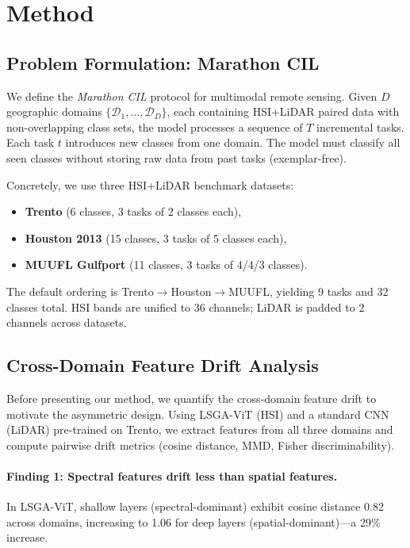 \section{Method}
\label{sec:method}

\subsection{Problem Formulation: Marathon CIL}
\label{sec:protocol}

We define the \emph{Marathon CIL} protocol for multimodal remote sensing. Given $D$ geographic domains $\{\mathcal{D}_1, \dots, \mathcal{D}_D\}$, each containing HSI+LiDAR paired data with non-overlapping class sets, the model processes a sequence of $T$ incremental tasks. Each task $t$ introduces new classes from one domain. The model must classify all seen classes without storing raw data from past tasks (exemplar-free).

Concretely, we use three HSI+LiDAR benchmark datasets:
\begin{itemize}
    \item \textbf{Trento} (6 classes, 3 tasks of 2 classes each),
    \item \textbf{Houston 2013} (15 classes, 3 tasks of 5 classes each),
    \item \textbf{MUUFL Gulfport} (11 classes, 3 tasks of 4/4/3 classes).
\end{itemize}
The default ordering is Trento$\to$Houston$\to$MUUFL, yielding 9 tasks and 32 classes total. HSI bands are unified to 36 channels; LiDAR is padded to 2 channels across datasets.

\subsection{Cross-Domain Feature Drift Analysis}
\label{sec:drift}

Before presenting our method, we quantify the cross-domain feature drift to motivate the asymmetric design. Using LSGA-ViT (HSI) and a standard CNN (LiDAR) pre-trained on Trento, we extract features from all three domains and compute pairwise drift metrics (cosine distance, MMD, Fisher discriminability).

\paragraph{Finding 1: Spectral features drift less than spatial features.}
In LSGA-ViT, shallow layers (spectral-dominant) exhibit cosine distance 0.82 across domains, increasing to 1.06 for deep layers (spatial-dominant)---a 29\% increase.

